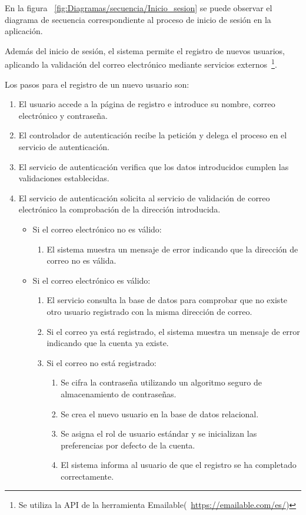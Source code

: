 En la figura ~\ref{fig:Diagramas/secuencia/Inicio_sesion} se puede observar el diagrama de secuencia correspondiente al proceso de inicio de sesión en la aplicación.


Además del inicio de sesión, el sistema permite el registro de nuevos usuarios, aplicando la validación del correo electrónico mediante servicios externos~\footnote{Se utiliza la API de la herramienta Emailable(~\url{https://emailable.com/es/})}.

Los pasos para el registro de un nuevo usuario son:
\begin{enumerate}
	\item El usuario accede a la página de registro e introduce su nombre, correo electrónico y contraseña.
	\item El controlador de autenticación recibe la petición y delega el proceso en el servicio de autenticación.
	\item El servicio de autenticación verifica que los datos introducidos cumplen las validaciones establecidas.
	\item El servicio de autenticación solicita al servicio de validación de correo electrónico la comprobación de la dirección introducida.
	\begin{itemize}
		\item Si el correo electrónico no es válido:
		\begin{enumerate}
			\item El sistema muestra un mensaje de error indicando que la dirección de correo no es válida.
		\end{enumerate}
		\item Si el correo electrónico es válido:
		\begin{enumerate}
			\item El servicio consulta la base de datos para comprobar que no existe otro usuario registrado con la misma dirección de correo.
			\item Si el correo ya está registrado, el sistema muestra un mensaje de error indicando que la cuenta ya existe.	
			\item Si el correo no está registrado:
			\begin{enumerate}
				\item Se cifra la contraseña utilizando un algoritmo seguro de almacenamiento de contraseñas.
				\item Se crea el nuevo usuario en la base de datos relacional.	
				\item Se asigna el rol de usuario estándar y se inicializan las preferencias por defecto de la cuenta.		
				\item El sistema informa al usuario de que el registro se ha completado correctamente.
			\end{enumerate}
		\end{enumerate}
	\end{itemize}
\end{enumerate}


